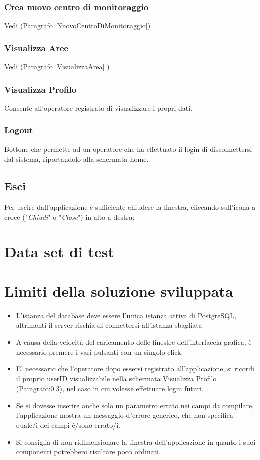 \subsection{Crea nuovo centro di monitoraggio}
Vedi (Paragrafo \ref{NuovoCentroDiMonitoraggio})
\subsection{Visualizza Aree}
Vedi (Paragrafo \ref{VisualizzaArea} )

\subsection{Visualizza Profilo} \label{Profilo}
Consente all'operatore registrato di visualizzare i propri dati.

\subsection{Logout}
Bottone che permette ad un operatore che ha effettuato il login di disconnettersi dal sistema, riportandolo alla schermata home. 

\section{Esci}
Per uscire dall'applicazione è sufficiente chiudere la finestra, cliccando sull'icona a croce ("\textit{Chiudi}" o "\textit{Close}") in alto a destra:

\chapter{Data set di test}

\chapter{Limiti della soluzione sviluppata}
\begin{itemize}
	\item L'istanza del database deve essere l'unica istanza attiva di PostgreSQL, altrimenti il server rischia di connettersi all'istanza sbagliata
	\item A causa della velocità del caricamento delle finestre dell'interfaccia grafica, è necessario premere i vari pulsanti con un singolo click.
	\item E' necessario che l'operatore dopo essersi registrato all'applicazione, si ricordi il proprio userID visualizzabile nella schermata Visualizza Profilo (Paragrafo:\ref{Profilo}), nel caso in cui volesse effettuare login futuri.  
	\item Se si dovesse inserire anche solo un parametro errato nei campi da compilare, l'applicazione mostra un messaggio d'errore generico, che non specifica quale/i dei campi è/sono errato/i.
	\item Si consiglia di non ridimensionare la finestra dell'applicazione in quanto i suoi componenti potrebbero risultare poco ordinati.
\end{itemize}

\nocite{IuriTex}


